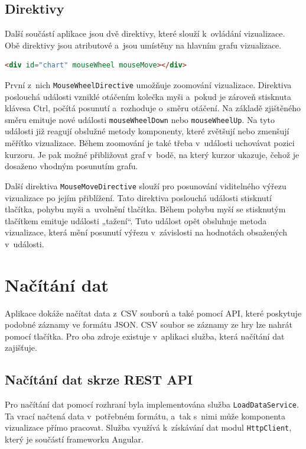 \documentclass[
  digital, %
  oneside, %
  table,   %
  nolof,     %
  nolot,     %
  nocover
]{fithesis3}
\begin{document}
\subsection{Direktivy} \label{directives}
Další součástí aplikace jsou dvě direktivy, které slouží k~ovládání vizualizace. Obě direktivy jsou atributové a~jsou umístěny na hlavním grafu vizualizace.\par
\begin{lstlisting}[showstringspaces=false,language=html]
<div id="chart" mouseWheel mouseMove></div>
\end{lstlisting}
První z~nich \verb|MouseWheelDirective| umožňuje zoomování vizualizace. Direktiva poslouchá události vzniklé otáčením kolečka myši a~pokud je zároveň stisknuta klávesa Ctrl, počítá posunutí a~rozhoduje o~směru otáčení. Na základě zjištěného směru emituje nové události \verb|mouseWheelDown| nebo \verb|mouseWheelUp|. Na tyto události již reagují obslužné metody komponenty, které zvětšují nebo zmenšují měřítko vizualizace. Během zoomování je také třeba v~události uchovávat pozici kurzoru. Je pak možné přibližovat graf v~bodě, na který kurzor ukazuje, čehož je dosaženo vhodným posunutím grafu.\par
Další direktiva \verb|MouseMoveDirective| slouží pro posunování viditelného výřezu vizualizace po jejím přiblížení. Tato direktiva poslouchá události stisknutí tlačítka, pohybu myši a~uvolnění tlačítka. Během pohybu myší se stisknutým tlačítkem emituje události „tažení“. Tuto událost opět obsluhuje metoda vizualizace, která mění posunutí výřezu v~závislosti na hodnotách obsažených v~události.

\section{Načítání dat}
Aplikace dokáže načítat data z~CSV souborů a také pomocí API, které poskytuje podobné záznamy ve formátu JSON. CSV soubor se záznamy ze hry lze nahrát pomocí tlačítka. Pro oba zdroje existuje v~aplikaci služba, která načítání dat zajišťuje.
\subsection{Načítání dat skrze REST API}
Pro načítání dat pomocí rozhraní byla implementována služba \verb|Load|\-\verb|DataService|. Ta vrací načtená data v~potřebném formátu, a~tak s~nimi může komponenta vizualizace přímo pracovat. Služba využívá k~získávání dat modul \verb|HttpClient|, který je součástí frameworku Angular.
\end{document}
